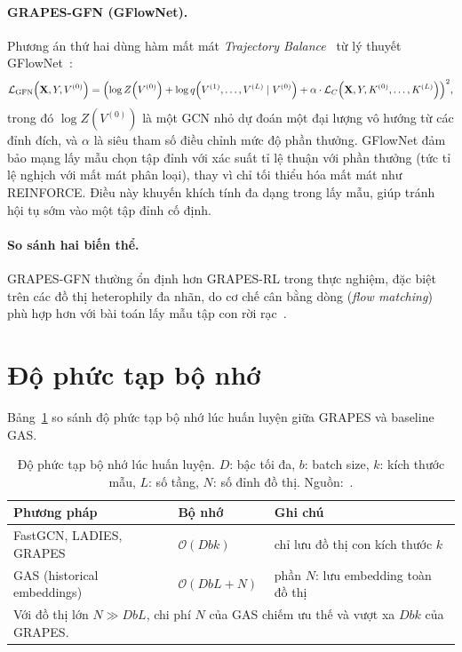 \paragraph{GRAPES-GFN (GFlowNet).} Phương án thứ hai dùng hàm mất mát \textit{Trajectory Balance}~\cite{Younesian2023GRAPES} từ lý thuyết GFlowNet~\cite{Bengio2021GFlowNet}:
\begin{equation}
\label{eq:gfn}
\mathcal{L}_{\mathrm{GFN}}\!\left(\mathbf{X}, Y, V^{(0)}\right)
= \Bigl(
    \log Z\!\left(V^{(0)}\right)
    + \log q\!\left(V^{(1)},\ldots,V^{(L)}\mid V^{(0)}\right)
    + \alpha \cdot \mathcal{L}_C\!\left(\mathbf{X}, Y, K^{(0)},\ldots,K^{(L)}\right)
  \Bigr)^2,
\end{equation}
trong đó $\log Z(V^{(0)})$ là một GCN nhỏ dự đoán một đại lượng vô hướng từ các đỉnh đích, và $\alpha$ là siêu tham số điều chỉnh mức độ phần thưởng. GFlowNet đảm bảo mạng lấy mẫu chọn tập đỉnh với xác suất tỉ lệ thuận với phần thưởng (tức tỉ lệ nghịch với mất mát phân loại), thay vì chỉ tối thiểu hóa mất mát như REINFORCE. Điều này khuyến khích tính đa dạng trong lấy mẫu, giúp tránh hội tụ sớm vào một tập đỉnh cố định.

\paragraph{So sánh hai biến thể.} GRAPES-GFN thường ổn định hơn GRAPES-RL trong thực nghiệm, đặc biệt trên các đồ thị heterophily đa nhãn, do cơ chế cân bằng dòng (\textit{flow matching}) phù hợp hơn với bài toán lấy mẫu tập con rời rạc~\cite{Younesian2023GRAPES}.

\section{Độ phức tạp bộ nhớ}

Bảng~\ref{tab:memory-complexity} so sánh độ phức tạp bộ nhớ lúc huấn luyện giữa GRAPES và baseline GAS.

\begin{table}[htbp]
\centering
\caption{Độ phức tạp bộ nhớ lúc huấn luyện. $D$: bậc tối đa, $b$: batch size, $k$: kích thước mẫu, $L$: số tầng, $N$: số đỉnh đồ thị. Nguồn:~\cite{Younesian2023GRAPES}.}
\label{tab:memory-complexity}
\small
\begin{tabular}{lll}
\toprule
\textbf{Phương pháp} & \textbf{Bộ nhớ} & \textbf{Ghi chú} \\
\midrule
FastGCN, LADIES, GRAPES & $\mathcal{O}(Dbk)$ & chỉ lưu đồ thị con kích thước $k$ \\
GAS (historical embeddings) & $\mathcal{O}(DbL + N)$ & phần $N$: lưu embedding toàn đồ thị \\
\midrule
\multicolumn{3}{l}{\footnotesize Với đồ thị lớn $N \gg DbL$, chi phí $N$ của GAS chiếm ưu thế và vượt xa $Dbk$ của GRAPES.}\\
\bottomrule
\end{tabular}
\end{table}


